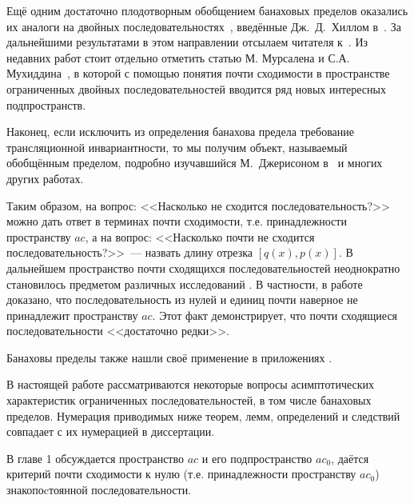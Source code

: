 Ещё одним достаточно плодотворным обобщением банаховых пределов оказались их аналоги на двойных последовательностях~\cite{robison1926divergent}, введённые Дж.~Д.~Хиллом в~\cite{hill1965almost}.
За дальнейшими результатами в этом направлении отсылаем читателя
к~\cite{moricz1988almost,bacsarir1995strong,mursaleen2003almost,edely2004almost,mursaleen2004almost}.
Из недавних работ стоит отдельно отметить статью М. Мурсалена и С.А. Мухиддина~\cite{mursaleen2012banach},
в которой с помощью понятия почти сходимости в пространстве ограниченных двойных последовательностей вводится ряд новых интересных подпространств.

Наконец, если исключить из определения банахова предела требование трансляционной инвариантности,
то мы получим объект, называемый обобщённым пределом,
подробно изучавшийся М.~Джерисоном в~\cite{jerison1957set} и многих других работах.


Таким образом, на вопрос: <<Насколько не сходится последовательность?>> %
можно дать ответ в терминах почти сходимости, т.е. принадлежности пространству $ac$,
а на вопрос: <<Насколько почти не сходится последовательность?>>~---
назвать длину отрезка $[q(x), p(x)]$.
В дальнейшем пространство почти сходящихся последовательностей неоднократно становилось предметом
различных исследований
\cite{semenov2006ac,usachev2008transforms}.
В частности, в работе~\cite{connor1990almost} доказано,
что последовательность из нулей и единиц почти наверное не принадлежит пространству $ac$.
Этот факт демонстрирует, что почти сходящиеся последовательности <<достаточно редки>>.


Банаховы пределы также нашли своё применение в приложениях
\cite{semenov2015banachtraces,SU,strukova2015spectres}.



В настоящей работе рассматриваются некоторые вопросы асимптотических характеристик ограниченных последовательностей,
в том числе банаховых пределов.
Нумерация приводимых ниже теорем, лемм, определений и следствий совпадает с их нумерацией в диссертации.


В главе 1 обсуждается пространство $ac$ и его подпространство $ac_0$,
даётся критерий почти сходимости к нулю (т.е. принадлежности пространству $ac_0$)
знакопоcтоянной последовательности.

